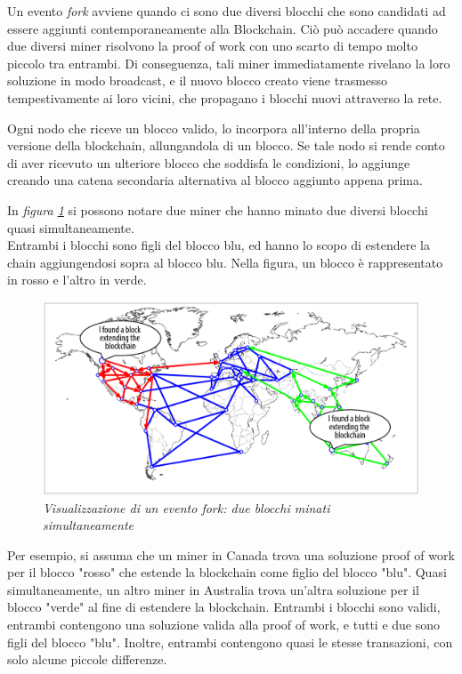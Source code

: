 Un evento \textit{fork} avviene quando ci sono due diversi blocchi che sono candidati ad essere aggiunti contemporaneamente alla Blockchain. Ciò può accadere quando due diversi miner risolvono la proof of work con uno scarto di tempo molto piccolo tra entrambi. Di conseguenza, tali miner immediatamente rivelano la loro soluzione in modo broadcast, e il nuovo blocco creato viene trasmesso tempestivamente ai loro vicini, che propagano i blocchi nuovi attraverso la rete. 

Ogni nodo che riceve un blocco valido, lo incorpora all'interno della propria versione della blockchain, allungandola di un blocco. Se tale nodo si rende conto di aver ricevuto un ulteriore blocco che soddisfa le condizioni, lo aggiunge creando una catena secondaria alternativa al blocco aggiunto appena prima.

In \textit{figura \ref{fig:fork2}} si possono notare due miner che hanno minato due diversi blocchi quasi simultaneamente.\\
Entrambi i blocchi sono figli del blocco blu, ed hanno lo scopo di estendere la chain aggiungendosi sopra al blocco blu. Nella figura, un blocco è rappresentato in rosso e l'altro in verde.
\begin{figure}[htbp]
	\centering
	\includegraphics[width=0.85 \linewidth]{figure/fork2}
	\caption{\textit{Visualizzazione di un evento fork: due blocchi minati simultaneamente} \label{fig:fork2}}
\end{figure}

Per esempio, si assuma che un miner in Canada trova una soluzione proof of work per il blocco "rosso" che estende la blockchain come figlio del blocco "blu". Quasi simultaneamente, un altro miner in Australia trova un'altra soluzione per il blocco "verde" al fine di estendere la blockchain. Entrambi i blocchi sono validi, entrambi contengono una soluzione valida alla proof of work, e tutti e due sono figli del blocco "blu". Inoltre, entrambi contengono quasi le stesse transazioni, con solo alcune piccole differenze.

